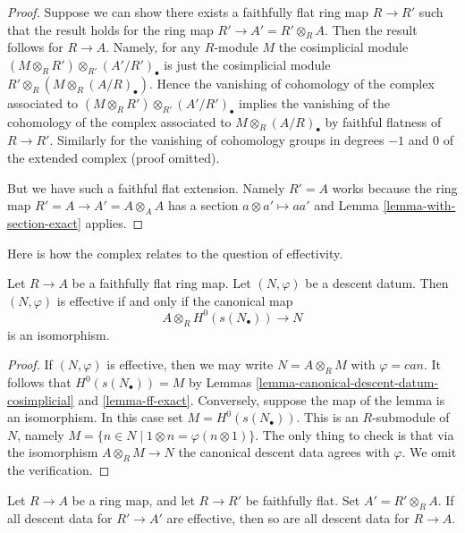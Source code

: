 \begin{proof}
Suppose we can show there exists a faithfully flat ring map
$R \to R'$ such that the result holds for the ring map
$R' \to A' = R' \otimes_R A$. Then the result follows for
$R \to A$. Namely, for any $R$-module $M$ the cosimplicial
module $(M \otimes_R R') \otimes_{R'} (A'/R')_\bullet$ is
just the cosimplicial module $R' \otimes_R (M \otimes_R (A/R)_\bullet)$.
Hence the vanishing of cohomology of the complex associated to
$(M \otimes_R R') \otimes_{R'} (A'/R')_\bullet$ implies the
vanishing of the cohomology of the complex associated to
$M \otimes_R (A/R)_\bullet$ by faithful flatness of $R \to R'$.
Similarly for the vanishing of cohomology groups in degrees
$-1$ and $0$ of the extended complex (proof omitted).

\medskip\noindent
But we have such a faithful flat extension. Namely $R' = A$ works
because the ring map $R' = A \to A' = A \otimes_A A$ has a section
$a \otimes a' \mapsto aa'$ and
Lemma \ref{lemma-with-section-exact}
applies.
\end{proof}

\noindent
Here is how the complex relates to the question of effectivity.

\begin{lemma}
\label{lemma-recognize-effective}
Let $R \to A$ be a faithfully flat ring map.
Let $(N, \varphi)$ be a descent datum.
Then $(N, \varphi)$ is effective if and only if the canonical
map
$$
A \otimes_R H^0(s(N_\bullet)) \longrightarrow N
$$
is an isomorphism.
\end{lemma}

\begin{proof}
If $(N, \varphi)$ is effective, then we may write $N = A \otimes_R M$
with $\varphi = can$. It follows that $H^0(s(N_\bullet)) = M$ by
Lemmas \ref{lemma-canonical-descent-datum-cosimplicial}
and \ref{lemma-ff-exact}. Conversely, suppose the map of the lemma
is an isomorphism. In this case set $M = H^0(s(N_\bullet))$.
This is an $R$-submodule of $N$,
namely $M = \{n \in N \mid 1 \otimes n = \varphi(n \otimes 1)\}$.
The only thing to check is that via the isomorphism
$A \otimes_R M \to N$
the canonical descent data agrees with $\varphi$.
We omit the verification.
\end{proof}

\begin{lemma}
\label{lemma-descent-descends}
Let $R \to A$ be a ring map, and let $R \to R'$ be faithfully flat.
Set $A' = R' \otimes_R A$. If all descent data for $R' \to A'$ are
effective, then so are all descent data for $R \to A$.
\end{lemma}

